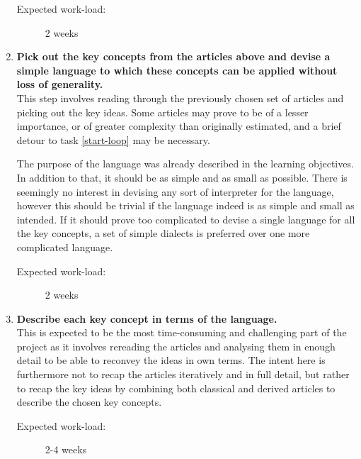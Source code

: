 \begin{enumerate}
\begin{description}

\item [Expected work-load:] 2 weeks

\end{description}

\item {\bf Pick out the key concepts from the articles above and devise a 
simple language to which these concepts can be applied without loss of 
generality.}\ \\

This step involves reading through the previously chosen set of articles and 
picking out the key ideas. Some articles may prove to be of a lesser 
importance, or of greater complexity than originally estimated, and a brief 
detour to task \ref{start-loop} may be necessary.

The purpose of the language was already described in the learning objectives.  
In addition to that, it should be as simple and as small as possible.  There is 
seemingly no interest in devising any sort of interpreter for the language, 
however this should be trivial if the language indeed is as simple and small as 
intended. If it should prove too complicated to devise a single language for 
all the key concepts, a set of simple dialects is preferred over one more 
complicated language.

\begin{description}

\item [Expected work-load:] 2 weeks

\end{description}

\item {\bf Describe each key concept in terms of the 
language.}\label{end-loop}\ \\

This is expected to be the most time-consuming and challenging part of the 
project as it involves rereading the articles and analysing them in enough 
detail to be able to reconvey the ideas in own terms. The intent here is 
furthermore not to recap the articles iteratively and in full detail, but 
rather to recap the key ideas by combining both classical and derived articles 
to describe the chosen key concepts.

\begin{description}

\item [Expected work-load:] 2-4 weeks


\end{description}
\end{enumerate}

